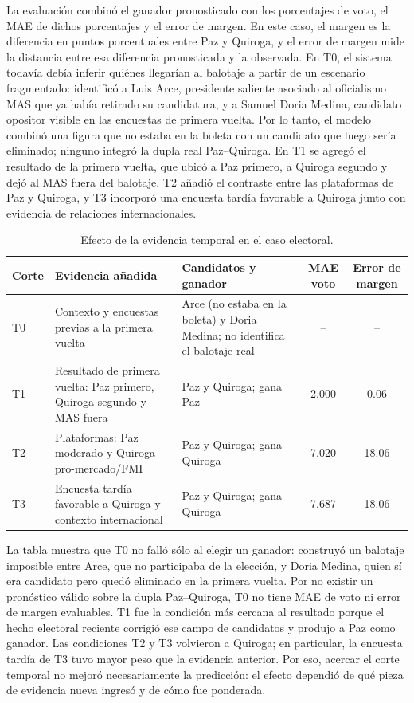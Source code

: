 \documentclass{article}
\begin{document}
La evaluación combinó el ganador pronosticado con los porcentajes de voto, el MAE de dichos porcentajes y el error de margen. En este caso, el margen es la diferencia en puntos porcentuales entre Paz y Quiroga, y el error de margen mide la distancia entre esa diferencia pronosticada y la observada. En T0, el sistema todavía debía inferir quiénes llegarían al balotaje a partir de un escenario fragmentado: identificó a Luis Arce, presidente saliente asociado al oficialismo MAS que ya había retirado su candidatura, y a Samuel Doria Medina, candidato opositor visible en las encuestas de primera vuelta. Por lo tanto, el modelo combinó una figura que no estaba en la boleta con un candidato que luego sería eliminado; ninguno integró la dupla real Paz--Quiroga. En T1 se agregó el resultado de la primera vuelta, que ubicó a Paz primero, a Quiroga segundo y dejó al MAS fuera del balotaje. T2 añadió el contraste entre las plataformas de Paz y Quiroga, y T3 incorporó una encuesta tardía favorable a Quiroga junto con evidencia de relaciones internacionales.

\begin{table}[H]
    \centering
    \small
    \begin{tabular}{@{}lp{4.8cm}p{4.3cm}cc@{}}
        \toprule
        \textbf{Corte} & \textbf{Evidencia añadida} & \textbf{Candidatos y ganador} & \textbf{MAE voto} & \textbf{Error de margen} \\ \midrule
        T0 & Contexto y encuestas previas a la primera vuelta & Arce (no estaba en la boleta) y Doria Medina; no identifica el balotaje real & -- & -- \\
        T1 & Resultado de primera vuelta: Paz primero, Quiroga segundo y MAS fuera & Paz y Quiroga; gana Paz & 2.000 & 0.06 \\
        T2 & Plataformas: Paz moderado y Quiroga pro-mercado/FMI & Paz y Quiroga; gana Quiroga & 7.020 & 18.06 \\
        T3 & Encuesta tardía favorable a Quiroga y contexto internacional & Paz y Quiroga; gana Quiroga & 7.687 & 18.06 \\ \bottomrule
    \end{tabular}
    \caption{Efecto de la evidencia temporal en el caso electoral.}
    \label{tab:seed_bolivia}
\end{table}

La tabla muestra que T0 no falló sólo al elegir un ganador: construyó un balotaje imposible entre Arce, que no participaba de la elección, y Doria Medina, quien sí era candidato pero quedó eliminado en la primera vuelta. Por no existir un pronóstico válido sobre la dupla Paz--Quiroga, T0 no tiene MAE de voto ni error de margen evaluables. T1 fue la condición más cercana al resultado porque el hecho electoral reciente corrigió ese campo de candidatos y produjo a Paz como ganador. Las condiciones T2 y T3 volvieron a Quiroga; en particular, la encuesta tardía de T3 tuvo mayor peso que la evidencia anterior. Por eso, acercar el corte temporal no mejoró necesariamente la predicción: el efecto dependió de qué pieza de evidencia nueva ingresó y de cómo fue ponderada.
\end{document}

